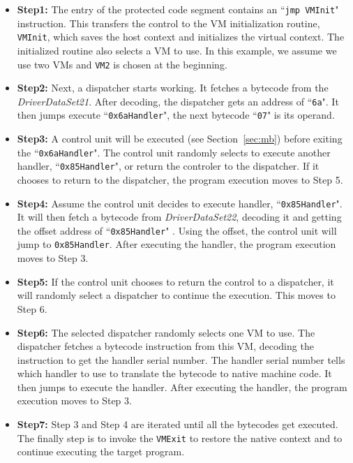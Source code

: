 \documentclass[conference]{IEEEtran}
\begin{document}
\begin{itemize}
\item \textbf{Step1:} The entry of the protected code segment contains an ``\texttt{jmp VMInit}" instruction. This transfers the control to the VM initialization routine, \texttt{VMInit}, which saves the host context and initializes the virtual context. The initialized routine also selects a VM to use. In this example, we assume we use two VMs and \texttt{VM2} is chosen at the beginning.
\item \textbf{Step2:} Next, a dispatcher starts working. It fetches a bytecode from the \emph{DriverDataSet21}. After decoding, the dispatcher gets an address of ``\texttt{6a}". It then jumps execute ``\texttt{0x6aHandler}", the next bytecode ``\texttt{07}" is its operand.
\item \textbf{Step3:} A control unit will be executed (see Section~\ref{sec:mb}) before exiting the ``\texttt{0x6aHandler}". The control unit randomly selects to execute another handler, ``\texttt{0x85Handler}", or return the controler to the dispatcher. If it chooses to return to the dispatcher, the program execution moves to Step 5.
\item \textbf{Step4:} Assume the control unit decides to execute handler, ``\texttt{0x85Handler}". It will then fetch a bytecode from \emph{DriverDataSet22}, decoding it and getting the offset address of ``\texttt{0x85Handler}" . Using the offset, the control unit will jump to \texttt{0x85Handler}. After executing the handler, the program execution moves to Step 3.
\item \textbf{Step5:} If the control unit chooses to return the control to a dispatcher, it will randomly select a dispatcher to continue the execution. This moves to Step 6.
\item \textbf{Step6:} The selected dispatcher randomly selects one VM to use. The dispatcher fetches a bytecode instruction from this VM, decoding the instruction to get the handler serial number. The handler serial number tells which handler to use to translate the bytecode to native machine code. It then jumps to execute the handler. After executing the handler, the program execution moves to Step 3.
\item \textbf{Step7:} Step 3 and Step 4 are iterated until all the bytecodes get executed. The finally step is to invoke the \texttt{VMExit} to restore the native context and to continue executing the target program.
\end{itemize}
\end{document}
